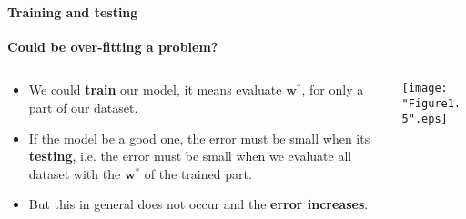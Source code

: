 \begin{frame}{\insertsubsection}
	\framesubtitle{Training and testing}
	\textcolor{UniGold}{\textbf{Could be over-fitting a problem?}}
	\begin{columns}
		\begin{column}{0.475\textwidth}
			\begin{itemize}	
			\item We could \textcolor{UniOrange}{\textbf{train}} our model, it means evaluate $\mathbf{w}^*$, for only a part of our dataset.
			\item If the model be a good one, the error must be small when its \textcolor{UniOrange}{\textbf{testing}}, i.e. the error must be small when we evaluate all dataset with the $\mathbf{w}^*$ of the trained part.
			\item But this in general does not occur and the \textcolor{UniOrange}{\textbf{error increases}}.
			\end{itemize}
		\end{column}
		\begin{column}{0.475\textwidth}  %
			\begin{center}
			\centering
			\label{fig:Erms}
			\texttt{[image: "Figure1.5".eps]}
			\end{center}
		\end{column}
	\end{columns}		
	\end{frame}

